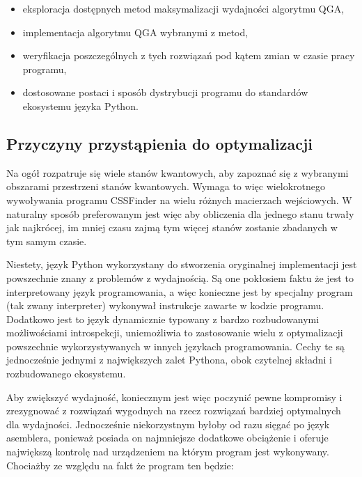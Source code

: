 \documentclass[11pt, a4paper]{article}
\begin{document}
\begin{sloppypar}
    \begin{itemize}
      \item eksploracja dostępnych metod maksymalizacji wydajności algorytmu QGA,

      \item implementacja algorytmu QGA wybranymi z metod,

      \item weryfikacja poszczególnych z tych rozwiązań pod kątem zmian w czasie pracy programu,

      \item dostosowane postaci i sposób dystrybucji programu do standardów ekosystemu języka
        Python.
    \end{itemize}

    \subsection{Przyczyny przystąpienia do optymalizacji}
    Na ogół rozpatruje się wiele stanów kwantowych, aby zapoznać się z wybranymi obszarami
    przestrzeni stanów kwantowych. Wymaga to więc wielokrotnego wywoływania programu
    CSSFinder na wielu różnych macierzach wejściowych. W naturalny sposób preferowanym jest
    więc aby obliczenia dla jednego stanu trwały jak najkrócej, im mniej czasu zajmą tym
    więcej stanów zostanie zbadanych w tym samym czasie.

    Niestety, język Python wykorzystany do stworzenia oryginalnej implementacji jest powszechnie
    znany z problemów z wydajnością\cite{srinath2017python}. Są one pokłosiem faktu że jest
    to interpretowany język programowania, a więc konieczne jest by specjalny program (tak
    zwany interpreter) wykonywał instrukcje zawarte w kodzie programu. Dodatkowo jest to
    język dynamicznie typowany z bardzo rozbudowanymi możliwościami introspekcji,
    uniemożliwia to zastosowanie wielu z optymalizacji powszechnie wykorzystywanych w
    innych językach programowania. Cechy te są jednocześnie jednymi z największych zalet
    Pythona, obok czytelnej składni i rozbudowanego ekosystemu.

    Aby zwiększyć wydajność, koniecznym jest więc poczynić pewne kompromisy i zrezygnować
    z rozwiązań wygodnych na rzecz rozwiązań bardziej optymalnych dla wydajności.
    Jednocześnie niekorzystnym byłoby od razu sięgać po język asemblera, ponieważ posiada
    on najmniejsze dodatkowe obciążenie i oferuje największą kontrolę nad urządzeniem na
    którym program jest wykonywany. Chociażby ze względu na fakt że program ten będzie:


\end{sloppypar}
\end{document}
